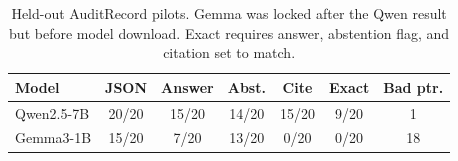 \begin{table}[!t]
\caption{Held-out AuditRecord pilots. Gemma was locked after the Qwen result but before model download. Exact requires answer, abstention flag, and citation set to match.}
\label{tab:llm-grounding}
\centering
\scriptsize
\setlength{\tabcolsep}{2pt}
\begin{tabular}{@{}lcccccc@{}}
\toprule
\textbf{Model} & \textbf{JSON} & \textbf{Answer} & \textbf{Abst.} & \textbf{Cite} & \textbf{Exact} & \textbf{Bad ptr.} \\
\midrule
Qwen2.5-7B & 20/20 & 15/20 & 14/20 & 15/20 & 9/20 & 1 \\
Gemma3-1B & 15/20 & 7/20 & 13/20 & 0/20 & 0/20 & 18 \\
\bottomrule
\end{tabular}
\end{table}
